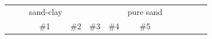 \begin{figure}
\begin{minipage}{0.98\textwidth}
			\centering
			\begin{tabular}{@{}r@{~}|@{~}c@{~}|@{~}c@{~}|@{~}c@{~}|@{~}c@{~}|@{~}c@{~}|@{~}c@{~}|@{~}c@{~}|@{~}c@{~}|@{~}c@{~}|@{~}c@{~}|}
				\multicolumn{2}{c}{~~~~~sand-clay}&
				\multicolumn{1}{c}{}&
				\multicolumn{1}{c}{}&
				\multicolumn{1}{c}{}&
				\multicolumn{1}{c}{pure sand}
				\\ 


				&
				\#1&%
				\#2&%
				\#3&%
				\#4&%
				\#5 
				\\ \hline


\end{tabular}
\end{minipage}
\end{figure}
